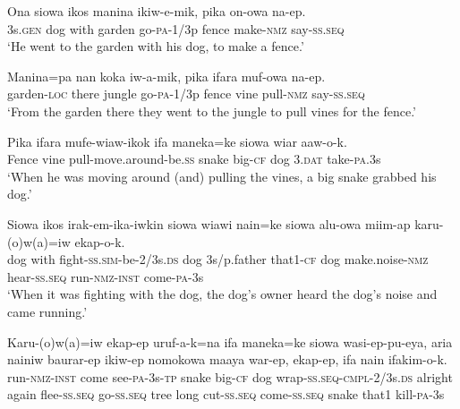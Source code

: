 {\ea\label{ex:a:x4}
\gll  Ona  siowa  ikos  manina  ikiw-e-mik,  pika  on-owa  na-ep. \\
3s.\textsc{gen}  dog  with  garden  go-\textsc{pa}-1/3p  fence  make-\textsc{nmz}  say-\textsc{ss.seq} \\
\glt ‘He went to the garden with his dog, to make a fence.’ \\
\z


\ea\label{ex:a:x5}
\gll  Manina=pa  nan  koka  iw-a-mik,  pika  ifara  muf-owa  na-ep. \\
garden-\textsc{loc}  there  jungle  go-\textsc{pa}-1/3p  fence  vine  pull-\textsc{nmz}  say-\textsc{ss.seq} \\
\glt ‘From the garden there they went to the jungle to pull vines for the fence.’ \\
\z


\ea\label{ex:a:x6}
\gll  Pika  ifara  mufe-wiaw-ikok  ifa  maneka=ke  siowa  wiar  aaw-o-k. \\
Fence  vine  pull-move.around-be.\textsc{ss}  snake  big-\textsc{cf}  dog  3.\textsc{dat}  take-\textsc{pa}.3s \\
\glt ‘When he was moving around (and) pulling the vines, a big snake grabbed his dog.’ \\
\z


\ea\label{ex:a:x7}
\gll  Siowa  ikos  irak-em-ika-iwkin  siowa  wiawi  nain=ke    siowa  alu-owa  miim-ap  karu-(o)w(a)=iw  ekap-o-k. \\
dog  with  fight-\textsc{ss}.\textsc{sim}-be-2/3s.\textsc{ds}  dog  3s/p.father  that1-\textsc{cf} dog  make.noise-\textsc{nmz}  hear-\textsc{ss.seq}  run-\textsc{nmz}-\textsc{inst}  come-\textsc{pa}-3s \\


\glt ‘When it was fighting with the dog, the dog’s owner heard the dog’s noise and came running.’ \\
\z


\ea\label{ex:a:x8}
\gll  Karu-(o)w(a)=iw  ekap-ep  uruf-a-k=na  ifa  maneka=ke  siowa  wasi-ep-pu-eya,  aria  nainiw  baurar-ep  ikiw-ep  nomokowa            maaya  war-ep,  ekap-ep,  ifa  nain  ifakim-o-k. \\
run-\textsc{nmz}-\textsc{inst}  come  see-\textsc{pa}-3s-\textsc{tp}  snake  big-\textsc{cf}  dog                wrap-\textsc{ss.seq}-\textsc{cmpl}-2/3s.\textsc{ds}  alright  again  flee-\textsc{ss.seq}  go-\textsc{ss.seq}  tree long  cut-\textsc{ss.seq}  come-\textsc{ss.seq}  snake  that1  kill-\textsc{pa}-3s \\




}
